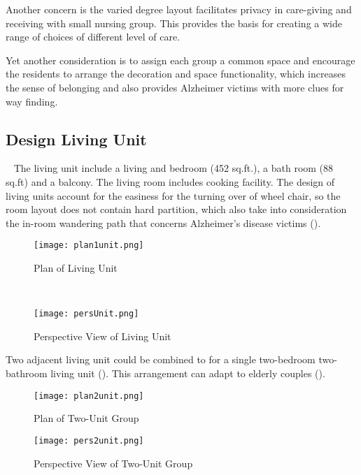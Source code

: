 Another concern is the varied degree layout facilitates privacy in
care-giving and receiving with small nursing group. This provides the
basis for creating a wide range of choices of different level of care.

Yet another consideration is to assign each group a common space and
encourage the residents to arrange the decoration and space
functionality, which increases the sense of belonging and also
provides Alzheimer victims with more clues for way finding.

\clearpage
\subsection{Design Living Unit}~
The living unit include a living and bedroom (452 sq.ft.), a bath room
(88 sq.ft) and a balcony. The living room includes cooking facility.
The design of living units account for the easiness for the turning
over of wheel chair, so the room layout does not contain hard
partition, which also take into consideration the in-room wandering
path that concerns Alzheimer's disease victims ().~
\begin{figure}[h!]
  \centering
  \texttt{[image: plan1unit.png]}
  \caption[Plan of Living Unit]{Plan of Living Unit}
  \label{fig:plan1unit}
\end{figure}
~
\begin{figure}[htbp]
  \centering
  \texttt{[image: persUnit.png]}
  \caption[Perspective View of Living Unit]{Perspective View of Living
    Unit}
  \label{fig:persUnit}
\end{figure}

Two adjacent living unit could be combined to for a single two-bedroom
two-bathroom living unit (). This arrangement
can adapt to elderly couples ().~
\begin{figure}[h!]
  \centering
  \texttt{[image: plan2unit.png]}
  \caption[Plan of Two-Unit Group]{Plan of Two-Unit Group}
  \label{fig:plan2unit}
\end{figure}
\begin{figure}[htbp]
  \centering
  \texttt{[image: pers2unit.png]}
  \caption[Perspective View of Two-Unit Group]{Perspective View of
    Two-Unit Group}
  \label{fig:pers2unit}
\end{figure}

